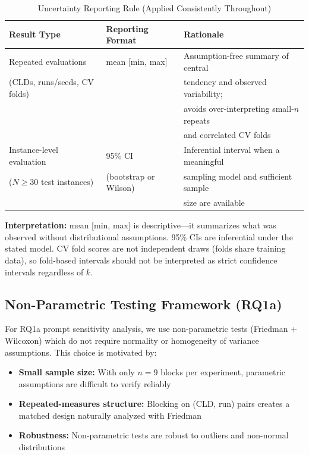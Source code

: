\begin{table}[H]
\centering
\caption{Uncertainty Reporting Rule (Applied Consistently Throughout)}
\label{tab:uncertainty_rule}
\footnotesize
\begin{tabular}{@{}l l l@{}}
\toprule
\textbf{Result Type} & \textbf{Reporting Format} & \textbf{Rationale} \\
\midrule
Repeated evaluations & mean [min, max] & Assumption-free summary of central \\
(CLDs, runs/seeds, CV folds) & & tendency and observed variability; \\
 & & avoids over-interpreting small-$n$ repeats \\
 & & and correlated CV folds \\
\midrule
Instance-level evaluation & 95\% CI & Inferential interval when a meaningful \\
($N \geq 30$ test instances) & (bootstrap or Wilson) & sampling model and sufficient sample \\
 & & size are available \\
\bottomrule
\end{tabular}
\end{table}

\textbf{Interpretation:} mean [min, max] is descriptive---it summarizes what was observed without distributional assumptions. 95\% CIs are inferential under the stated model. CV fold scores are not independent draws (folds share training data), so fold-based intervals should not be interpreted as strict confidence intervals regardless of $k$.

\subsection{Non-Parametric Testing Framework (RQ1a)}

For RQ1a prompt sensitivity analysis, we use non-parametric tests (Friedman + Wilcoxon) which do not require normality or homogeneity of variance assumptions. This choice is motivated by:
\begin{itemize}[noitemsep]
    \item \textbf{Small sample size:} With only $n=9$ blocks per experiment, parametric assumptions are difficult to verify reliably
    \item \textbf{Repeated-measures structure:} Blocking on (CLD, run) pairs creates a matched design naturally analyzed with Friedman
    \item \textbf{Robustness:} Non-parametric tests are robust to outliers and non-normal distributions
\end{itemize}


